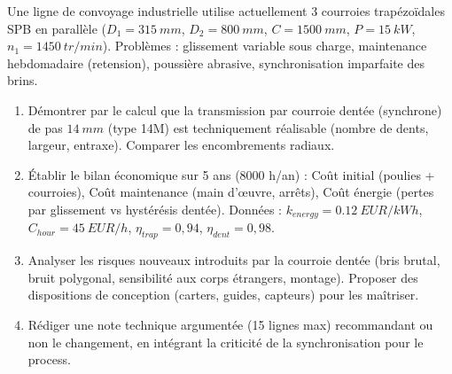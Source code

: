\documentclass[11pt]{article}
\begin{document}
\begin{exercice}
Une ligne de convoyage industrielle utilise actuellement 3 courroies trapézoïdales SPB en parallèle ($D_1=\SI{315}{mm}$, $D_2=\SI{800}{mm}$, $C=\SI{1500}{mm}$, $P=\SI{15}{kW}$, $n_1=\SI{1450}{tr/min}$). Problèmes : glissement variable sous charge, maintenance hebdomadaire (retension), poussière abrasive, synchronisation imparfaite des brins.
\begin{enumerate}
    \item Démontrer par le calcul que la transmission par courroie dentée (synchrone) de pas $\SI{14}{mm}$ (type 14M) est techniquement réalisable (nombre de dents, largeur, entraxe). Comparer les encombrements radiaux.
    \item Établir le bilan économique sur 5 ans (8000 h/an) : Coût initial (poulies + courroies), Coût maintenance (main d'œuvre, arrêts), Coût énergie (pertes par glissement vs hystérésis dentée). Données : $k_{energy}=\SI{0,12}{EUR/kWh}$, $C_{hour}=\SI{45}{EUR/h}$, $\eta_{trap}=0,94$, $\eta_{dent}=0,98$.
    \item Analyser les risques nouveaux introduits par la courroie dentée (bris brutal, bruit polygonal, sensibilité aux corps étrangers, montage). Proposer des dispositions de conception (carters, guides, capteurs) pour les maîtriser.
    \item Rédiger une note technique argumentée (15 lignes max) recommandant ou non le changement, en intégrant la criticité de la synchronisation pour le process.
\end{enumerate}
\end{exercice}
\end{document}
